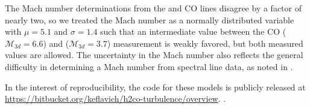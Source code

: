 The Mach number determinations from the \formaldehyde and CO lines disagree by
a factor of nearly two, so we treated the Mach number as a normally distributed
variable with $\mu=5.1$ and $\sigma=1.4$ such that an intermediate value
between the CO ($\mathcal{M}_{3d} = 6.6$) and \formaldehyde ($\mathcal{M}_{3d}
= 3.7$) measurement is weakly favored, but both measured values are allowed.
The uncertainty in the Mach number also reflects the general difficulty in determining
a Mach number from spectral line data, as noted in \citet{Schneider2013a}.

In the interest of reproducibility, the code for these models is publicly
released at \url{https://bitbucket.org/keflavich/h2co-turbulence/overview}.
.

% 
% 
% 



